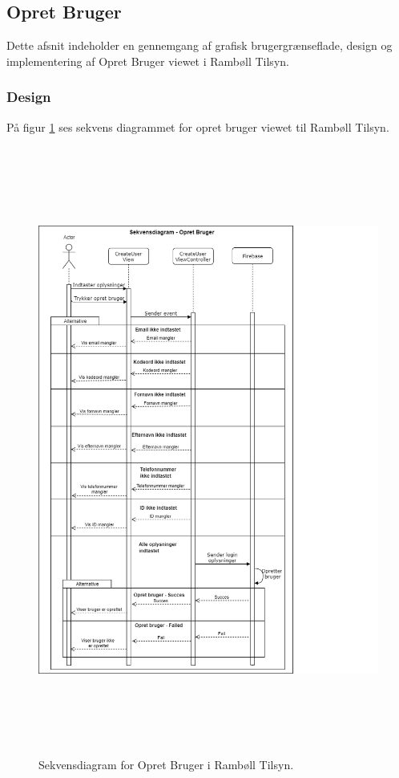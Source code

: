 \subsection{Opret Bruger}
Dette afsnit indeholder en gennemgang af grafisk brugergrænseflade, design og implementering af Opret Bruger viewet i Rambøll Tilsyn.

\subsubsection{Design}
På figur \ref{fig:OpretBrugerSekvens} ses sekvens diagrammet for opret bruger viewet til Rambøll Tilsyn.
\begin{figure}[H] %
	\centering
	\includegraphics[height=20cm, width=15cm]{../ArkitekturDesign/Design/OpretBruger/OpretBrugerSekvensDiagram}
	\caption{Sekvensdiagram for Opret Bruger i Rambøll Tilsyn.}
	\label{fig:OpretBrugerSekvens}
\end{figure}

